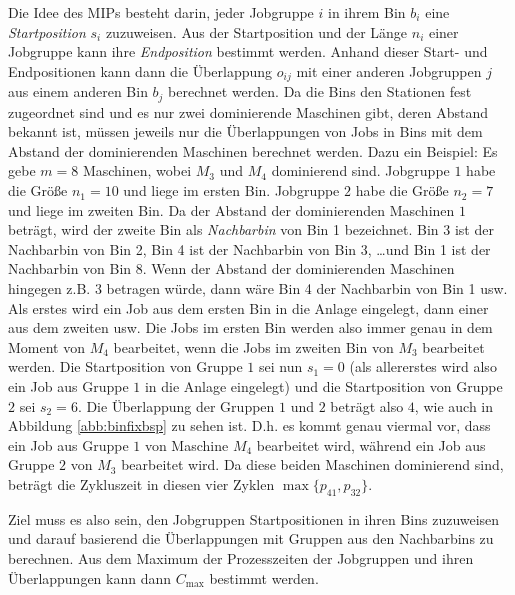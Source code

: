 \documentclass{scrreprt}
\begin{document}
Die Idee des MIPs besteht darin, jeder Jobgruppe $i$ in ihrem Bin $b_i$ eine \textit{Startposition} $s_i$ zuzuweisen.
Aus der Startposition und der Länge $n_i$ einer Jobgruppe kann ihre \textit{Endposition} bestimmt werden.
Anhand dieser Start- und Endpositionen kann dann die Überlappung $o_{ij}$ mit einer anderen Jobgruppen $j$ aus einem anderen Bin $b_j$
berechnet werden.
Da die Bins den Stationen fest zugeordnet sind und es nur zwei dominierende Maschinen gibt, deren Abstand bekannt ist, 
müssen jeweils nur die Überlappungen von Jobs in Bins mit dem Abstand der dominierenden Maschinen berechnet werden.
Dazu ein Beispiel: Es gebe $m=8$ Maschinen, wobei $M_3$ und $M_4$ dominierend sind. 
Jobgruppe $1$ habe die Größe $n_1=10$ und liege im ersten Bin.
Jobgruppe $2$ habe die Größe $n_2=7$ und liege im zweiten Bin.
Da der Abstand der dominierenden Maschinen $1$ beträgt, wird der zweite Bin als \textit{Nachbarbin} von Bin 1 bezeichnet.
Bin 3 ist der Nachbarbin von Bin 2, Bin 4 ist der Nachbarbin von Bin 3, \ldots und Bin 1 ist der Nachbarbin von Bin 8.
Wenn der Abstand der dominierenden Maschinen hingegen z.B. $3$ betragen würde, dann wäre Bin 4 der Nachbarbin von Bin 1 usw.
Als erstes wird ein Job aus dem ersten Bin in die Anlage eingelegt, dann einer aus dem zweiten usw. 
Die Jobs im ersten Bin werden also immer genau in dem Moment von $M_4$ bearbeitet, wenn die Jobs im zweiten Bin von $M_3$ bearbeitet werden.
Die Startposition von Gruppe $1$ sei nun $s_1=0$ (als allererstes wird also ein Job aus Gruppe $1$ in die Anlage eingelegt)
und die Startposition von Gruppe $2$ sei $s_2=6$.
Die Überlappung der Gruppen $1$ und $2$ beträgt also $4$, wie auch in Abbildung \ref{abb:binfixbsp} zu sehen ist.
D.h. es kommt genau viermal vor, dass ein Job aus Gruppe $1$ von Maschine $M_4$ bearbeitet wird, während ein Job aus Gruppe $2$ von $M_3$ bearbeitet wird.
Da diese beiden Maschinen dominierend sind, beträgt die Zykluszeit in diesen vier Zyklen $\max\{p_{41},p_{32}\}$.

Ziel muss es also sein, den Jobgruppen Startpositionen in ihren Bins zuzuweisen und darauf basierend die Überlappungen mit Gruppen 
aus den Nachbarbins zu berechnen. 
Aus dem Maximum der Prozesszeiten der Jobgruppen und ihren Überlappungen kann dann $C_{\max}$ bestimmt werden.
\end{document}
